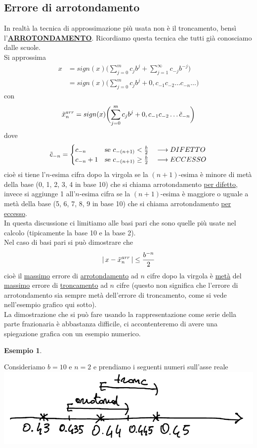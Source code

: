\documentclass[12pt]{article}
\newtheorem*{esempio}{Esempio}
\begin{document}
\subsection*{Errore di arrotondamento}
In realtà la tecnica di approssimazione più usata non è il troncamento, bensì l'\underline{\textbf{ARROTONDAMENTO}}. Ricordiamo questa tecnica che tutti già conosciamo dalle scuole. \\
Si approssima 
\[ \begin{split}
    x & = sign(x)\biggl( \sum_{j=0}^m c_j b^j + \sum_{j=1}^\infty c_{-j} b^{-j} \biggr) \\
    & = sign(x) \biggl( \sum_{j=0}^m c_j b^j + 0,c_{-1}c_{-2} \dotsc c_{-n} \dotsc \biggr) 
\end{split} \]
con \[ \Tilde{x}_n^{arr} = sign(x) \biggl( \sum_{j=0}^m c_j b^j + 0,c_{-1}c_{-2} \dotsc \Tilde{c}_{-n} \biggr) \]
dove \[\Tilde{c}_{-n} = 
\begin{cases}
    c_{-n} & \text{se $c_{-(n+1)} < \frac{b}{2} \quad \longrightarrow DIFETTO$} \\
    c_{-n}+1 & \text{se $c_{-(n+1)} \ge \frac{b}{2} \quad \longrightarrow ECCESSO$}
\end{cases}
\]
cioè si tiene l'$n$-esima cifra dopo la virgola se la $(n+1)$-esima è minore di metà della base (0, 1, 2, 3, 4 in base 10) che si chiama arrotondamento \underline{per difetto}, invece si aggiunge 1 all'$n$-esima cifra se la $(n+1)$-esima è maggiore o uguale a metà della base (5, 6, 7, 8, 9 in base 10) che si chiama arrotondamento \underline{per eccesso}.\\
In questa discussione ci limitiamo alle basi pari che sono quelle più usate nel calcolo (tipicamente la base 10 e la base 2). \\
Nel caso di basi pari si può dimostrare che
\[ \lvert \, x - \Tilde{x}_n^{arr} \,\rvert \le \frac{b^{-n}}{2}\]
cioè il \underline{massimo} errore di \underline{arrotondamento} ad $n$ cifre dopo la virgola è \underline{metà} del \underline{massimo} errore di \underline{troncamento} ad $n$ cifre (questo non significa che l'errore di arrotondamento sia sempre metà dell'errore di troncamento, come si vede nell'esempio grafico qui sotto).\\
La dimostrazione che si può fare usando la rappresentazione come serie della parte frazionaria è abbastanza difficile, ci accontenteremo di avere una spiegazione grafica con un esempio numerico.
\begin{esempio} \end{esempio}
Consideriamo $b=10$ e $n=2$ e prendiamo i seguenti numeri sull'asse reale \newline
\includegraphics[width=\linewidth]{img1}
\end{document}
